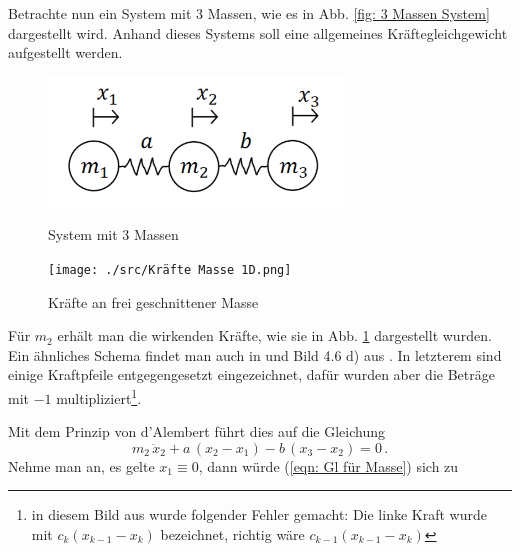\documentclass[a4paper,12pt]{report}
\newcommand{\1}{\mathds{1}}
\theoremstyle{plain} %
\theoremstyle{definition} %
\theoremstyle{remark}
\begin{document}
            Betrachte nun ein System mit 3 Massen, wie es in Abb. \ref{fig: 3 Massen System} dargestellt wird.
            Anhand dieses Systems soll eine allgemeines Kräftegleichgewicht aufgestellt werden.

            \begin{figure}[h!t]
                  \centering
                  \begin{minipage}[ht]{0.49\linewidth}
                        \centering
                        \includegraphics[width=0.7\textwidth, keepaspectratio]{./3 Massen System.png}
                        \caption{System mit 3 Massen}
                        \label{fig: 3 Massen System}
                  \end{minipage}
                  \hfill
                  \begin{minipage}[ht]{0.49\linewidth}
                        \centering
                        \texttt{[image: ./src/Kräfte Masse 1D.png]}
                        \caption{Kräfte an frei geschnittener Masse}
                        \label{fig: Kräfte Masse 1D}
                  \end{minipage}
            \end{figure}
            Für $m_2$ erhält man die wirkenden Kräfte, wie sie in Abb. \ref{fig: Kräfte Masse 1D} dargestellt wurden.
            Ein ähnliches Schema findet man auch in \cite{präsiLängsschwinger} und Bild 4.6 d) aus \cite[S. 237]{maschinendynamikDresig}.
            In letzterem sind einige Kraftpfeile entgegengesetzt eingezeichnet, dafür wurden aber die Beträge mit $-1$ multipliziert\footnote{in diesem Bild aus \cite{maschinendynamikDresig} wurde folgender Fehler gemacht: Die linke Kraft wurde mit $c_k (x_{k-1}-x_k)$ bezeichnet, richtig wäre $c_{k-1} (x_{k-1}-x_k)$}.
            
            Mit dem Prinzip von d'Alembert führt dies auf die Gleichung
            \begin{equation}
                  \label{eqn: Gl für Masse}
                  m_2\,\ddot x_2 + a\,(x_2-x_1) - b\,(x_3-x_2) = 0\,.
            \end{equation}
            Nehme man an, es gelte $x_1 \equiv 0$,
            dann würde (\ref{eqn: Gl für Masse}) sich zu
\end{document}
